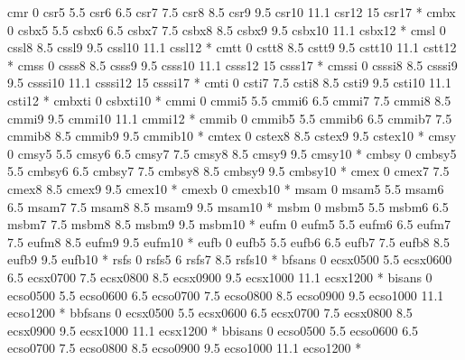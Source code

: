 \regtfm cmr 0 csr5 5.5 csr6 6.5 csr7 7.5 csr8 8.5 csr9 9.5
              csr10 11.1 csr12 15 csr17 *
\regtfm cmbx 0 csbx5 5.5 csbx6 6.5 csbx7 7.5 csbx8 8.5 csbx9 9.5 
              csbx10 11.1 csbx12 *
\regtfm cmsl 0 cssl8 8.5 cssl9 9.5 cssl10 11.1 cssl12 *
\regtfm cmtt 0 cstt8 8.5 cstt9 9.5 cstt10 11.1 cstt12 *
\regtfm cmss 0 csss8 8.5 csss9 9.5 csss10 11.1 csss12 15 csss17 *
\regtfm cmssi 0 csssi8 8.5 csssi9 9.5 csssi10 11.1 csssi12 15 csssi17 *
\regtfm cmti 0 csti7 7.5 csti8 8.5 csti9 9.5 csti10 11.1 csti12 *
\regtfm cmbxti 0 csbxti10 *
\regtfm cmmi 0 cmmi5 5.5 cmmi6 6.5 cmmi7 7.5 cmmi8 8.5 cmmi9 9.5
              cmmi10 11.1 cmmi12 *
\regtfm cmmib 0 cmmib5 5.5 cmmib6 6.5 cmmib7 7.5 cmmib8 8.5 cmmib9
             9.5 cmmib10 *
\regtfm cmtex 0 cstex8 8.5 cstex9 9.5 cstex10 *
\regtfm cmsy 0 cmsy5 5.5 cmsy6 6.5 cmsy7 7.5 cmsy8 8.5 cmsy9 9.5
              cmsy10 *
\regtfm cmbsy 0 cmbsy5 5.5 cmbsy6 6.5 cmbsy7 7.5 cmbsy8 8.5 cmbsy9 9.5
              cmbsy10 *  
\regtfm cmex 0 cmex7 7.5 cmex8 8.5 cmex9 9.5 cmex10 *
\regtfm cmexb 0 cmexb10 *
\regtfm msam 0 msam5 5.5 msam6 6.5 msam7 7.5 msam8 8.5 msam9
             9.5 msam10 *
\regtfm msbm 0 msbm5 5.5 msbm6 6.5 msbm7 7.5 msbm8 8.5 msbm9 
             9.5 msbm10 *
\regtfm eufm 0 eufm5 5.5 eufm6 6.5 eufm7 7.5 eufm8 8.5 eufm9 
             9.5 eufm10 *
\regtfm eufb 0 eufb5 5.5 eufb6 6.5 eufb7 7.5 eufb8 8.5 eufb9 
             9.5 eufb10 *
\regtfm rsfs 0 rsfs5 6 rsfs7 8.5 rsfs10 *
\regtfm bfsans 0 ecsx0500 5.5 ecsx0600 6.5 ecsx0700 7.5 ecsx0800 
             8.5 ecsx0900 9.5 ecsx1000 11.1 ecsx1200 * 
\regtfm bisans 0 ecso0500 5.5 ecso0600 6.5 ecso0700 7.5 ecso0800 
             8.5 ecso0900 9.5 ecso1000 11.1 ecso1200 * 
\regtfm bbfsans 0 ecsx0500 5.5 ecsx0600 6.5 ecsx0700 7.5 ecsx0800 
             8.5 ecsx0900 9.5 ecsx1000 11.1 ecsx1200 * 
\regtfm bbisans 0 ecso0500 5.5 ecso0600 6.5 ecso0700 7.5 ecso0800 
             8.5 ecso0900 9.5 ecso1000 11.1 ecso1200 * 

\fi


\def\corrmsizes{\ptmunit=1\ptunit\relax} %


\ifx\rfontskipat\undefined  \fi

